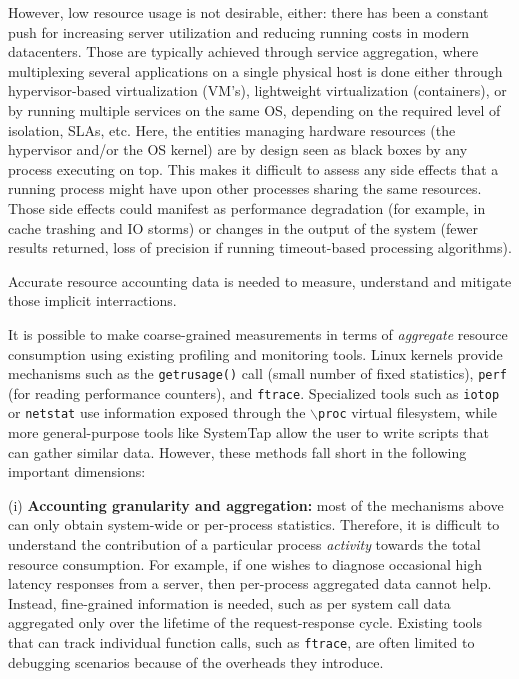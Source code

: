 \documentclass[letterpaper,twocolumn,10pt]{article}
\newcommand{\lnote}[1]{\textcolor{red}{[\textit{#1}]}} %
\begin{document}
However, low resource usage is not desirable, either: there has been a constant
push for increasing server utilization and reducing running costs in modern
datacenters. Those are typically achieved through service aggregation, where
multiplexing several applications on a single physical host is done either
through hypervisor-based virtualization (VM's), lightweight virtualization
(containers), or by running multiple services on the same OS, depending on the
required level of isolation, SLAs, etc. %
Here, the entities managing hardware resources (the hypervisor and/or the OS
kernel) are by design seen as black boxes by any process executing on top. This
makes it difficult to assess any side effects that a running process might have
upon other processes sharing the same resources. Those side effects could
manifest as performance degradation (for example, in cache trashing and IO
storms) or changes in the output of the system (fewer results returned, loss of
precision if running timeout-based processing algorithms).


Accurate resource accounting data is needed to measure, understand and mitigate
those implicit interractions.


It is possible to make coarse-grained measurements in terms of
\textit{aggregate} resource consumption using existing profiling and monitoring
tools. Linux kernels provide mechanisms such as the \texttt{getrusage()} call
(small number of fixed statistics), \texttt{perf} (for reading performance
counters), and \texttt{ftrace}. Specialized tools such as \texttt{iotop} or
\texttt{netstat} use information exposed through the \texttt{$\backslash$proc}
virtual filesystem, while more general-purpose tools like SystemTap allow the
user to write scripts that can gather similar data. However, these methods fall
short in the following important dimensions:

(i) \textbf{Accounting granularity and aggregation:} most of the mechanisms
above can only obtain system-wide or per-process statistics. Therefore, it is
difficult to understand the contribution of a particular process
\textit{activity} towards the total resource consumption. For example, if one
wishes to diagnose occasional high latency responses from a server, then
per-process aggregated data cannot help. Instead, fine-grained information is
needed, such as per system call data aggregated only over the lifetime of the
request-response cycle. Existing tools that can track individual function calls,
such as \texttt{ftrace}, are often limited to debugging scenarios because of the overheads
they introduce.
\end{document}
